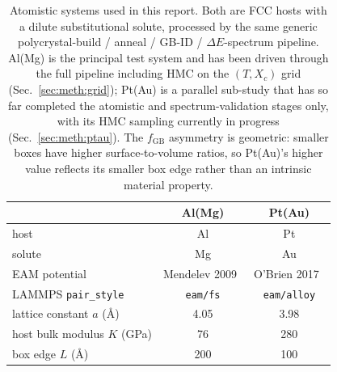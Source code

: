 
\begin{table}[t]
\centering
\caption{Atomistic systems used in this report. Both are FCC hosts with
a dilute substitutional solute, processed by the same generic
polycrystal-build / anneal / GB-ID / $\Delta E$-spectrum pipeline.
Al(Mg) is the principal test system and has been driven through the
full pipeline including HMC on the $(T, X_c)$ grid
(Sec.~\ref{sec:meth:grid}); Pt(Au) is a parallel sub-study that has
so far completed the atomistic and spectrum-validation stages only,
with its HMC sampling currently in progress
(Sec.~\ref{sec:meth:ptau}). The $f_\mathrm{GB}$ asymmetry is
geometric: smaller boxes have higher surface-to-volume ratios, so
Pt(Au)'s higher value reflects its smaller box edge rather than an
intrinsic material property.}
\label{tab:systems}
\begin{tabular}{lcc}
\toprule
                                          & Al(Mg)                            & Pt(Au)                          \\
\midrule
host                                      & Al                                & Pt                              \\
solute                                    & Mg                                & Au                              \\
EAM potential                             & Mendelev 2009~\cite{Mendelev2009} & O'Brien 2017~\cite{OBrien2017}  \\
\quad LAMMPS \texttt{pair\_style}         & \texttt{eam/fs}                   & \texttt{eam/alloy}              \\
lattice constant $a$ (\AA)                & 4.05                              & 3.98                            \\
host bulk modulus $K$ (GPa)               & 76                                & 280                             \\
box edge $L$ (\AA)                        & 200                               & 100                             \\

\end{tabular}
\end{table}
